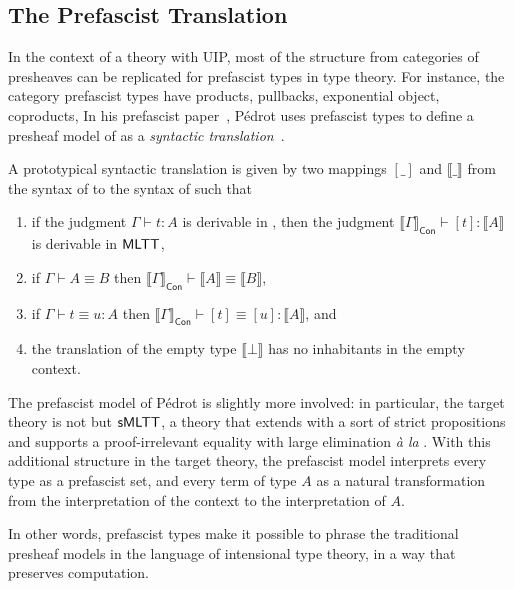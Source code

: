 \subsection{The Prefascist Translation}

In the context of a theory with UIP, most of the structure from categories of
presheaves can be replicated for prefascist types in type theory. For instance,
the category prefascist types have products, pullbacks, exponential object,
coproducts, \etc
% 
In his prefascist paper~, Pédrot uses prefascist 
types to define a presheaf model of \MLTT as a \emph{syntactic 
translation}~.

A prototypical syntactic translation is given by two mappings \( [\_] \) and
\( \llbracket \_ \rrbracket \) from the syntax of \MLTT to the syntax of 
\MLTT such that
% 
\begin{enumerate}
\item if the judgment \( \Gamma \vdash t : A \) is derivable in \MLTT, then 
the judgment
\( {\llbracket \Gamma \rrbracket_{\mathsf{Con}} \vdash [t] : \llbracket A \rrbracket} \)
is derivable in \( \mathsf{MLTT} \), 
\item if \( \Gamma \vdash A \equiv B \) then
\( {\llbracket \Gamma \rrbracket_{\mathsf{Con}} \vdash \llbracket A \rrbracket \equiv \llbracket B \rrbracket} \),
\item if \( \Gamma \vdash t \equiv u : A \) then
\( {\llbracket \Gamma \rrbracket_{\mathsf{Con}} \vdash [t] \equiv [u] : \llbracket A \rrbracket} \), and
\item the translation of the empty type \( \llbracket \bot \rrbracket \) has no 
inhabitants in the empty context.
\end{enumerate}
% 

The prefascist model of Pédrot is slightly more involved: in particular, the target theory
is not \MLTT but \( \mathsf{sMLTT} \), a theory that extends \MLTT with a sort of 
strict propositions and supports a proof-irrelevant equality with large
elimination \emph{à la} \Lean.
% 
With this additional structure in the target theory, the prefascist model
interprets every type as a prefascist set, and every term of type \( A \) as a 
natural transformation from the interpretation of the context to the 
interpretation of \( A \).

In other words, prefascist types make it possible to phrase the traditional
presheaf models in the language of intensional type theory, in a way that 
preserves computation.

